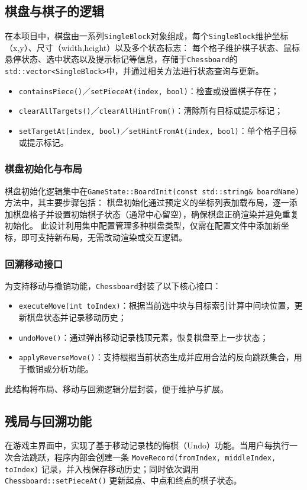 \documentclass[12pt, a4paper]{article}
\begin{document}
\subsection{棋盘与棋子的逻辑}
在本项目中，棋盘由一系列\texttt{SingleBlock}对象组成，每个\texttt{SingleBlock}维护坐标（x,y）、尺寸（width,height）以及多个状态标志：
每个格子维护棋子状态、鼠标悬停状态、选中状态以及提示标记等信息，存储于\texttt{Chessboard}的\texttt{std::vector<SingleBlock>}中，并通过相关方法进行状态查询与更新。
\begin{itemize}
  \item \texttt{containsPiece()}／\texttt{setPieceAt(index, bool)}：检查或设置棋子存在；
  \item \texttt{clearAllTargets()}／\texttt{clearAllHintFrom()}：清除所有目标或提示标记；
  \item \texttt{setTargetAt(index, bool)}／\texttt{setHintFromAt(index, bool)}：单个格子目标或提示标记。
\end{itemize}

\subsubsection{棋盘初始化与布局}
棋盘初始化逻辑集中在\texttt{GameState::BoardInit(const std::string\& boardName)}方法中，其主要步骤包括：
棋盘初始化通过预定义的坐标列表加载布局，逐一添加棋盘格子并设置初始棋子状态（通常中心留空），确保棋盘正确渲染并避免重复初始化。
此设计利用集中配置管理多种棋盘类型，仅需在配置文件中添加新坐标，即可支持新布局，无需改动渲染或交互逻辑。

\subsubsection{回溯移动接口}
为支持移动与撤销功能，\texttt{Chessboard}封装了以下核心接口：
\begin{itemize}
    \item \texttt{executeMove(int toIndex)}：根据当前选中块与目标索引计算中间块位置，更新棋盘状态并记录移动历史；
    \item \texttt{undoMove()}：通过弹出移动记录栈顶元素，恢复棋盘至上一步状态；
    \item \texttt{applyReverseMove()}：支持根据当前状态生成并应用合法的反向跳跃集合，用于撤销或分析功能。
\end{itemize}
此结构将布局、移动与回溯逻辑分层封装，便于维护与扩展。

\subsection{残局与回溯功能}
在游戏主界面中，实现了基于移动记录栈的悔棋（Undo）功能。当用户每执行一次合法跳跃，程序内部会创建一条 \texttt{MoveRecord(fromIndex, middleIndex, toIndex)} 记录，并入栈保存移动历史；同时依次调用 \texttt{Chessboard::setPieceAt()} 更新起点、中点和终点的棋子状态。
\end{document}
